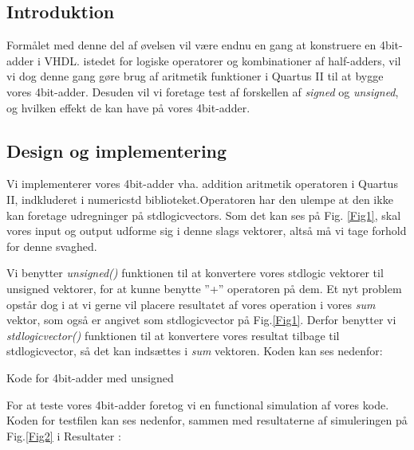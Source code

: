 \documentclass[../journal2.tex]{subfiles}
\begin{document}
\subsection{Introduktion}
Formålet med denne del af øvelsen vil være endnu en gang at konstruere en 4bit-adder i VHDL. istedet for logiske operatorer og kombinationer af half-adders, vil vi dog denne gang gøre brug af aritmetik funktioner i Quartus II til at bygge vores 4bit-adder. Desuden vil vi foretage test af forskellen af \textit{signed} og \textit{unsigned}, og hvilken effekt de kan have på vores 4bit-adder.

\subsection{Design og implementering}
Vi implementerer vores 4bit-adder vha. addition aritmetik operatoren i Quartus II, indkluderet i numeric\textunderscore std biblioteket.Operatoren har den ulempe at den ikke kan foretage udregninger på std\textunderscore logic\textunderscore vectors. Som det kan ses på Fig. \ref{Fig1}, skal vores input og output udforme sig i denne slags vektorer, altså må vi tage forhold for denne svaghed.


Vi benytter \textit{unsigned()} funktionen til at konvertere vores std\textunderscore logic vektorer til unsigned vektorer, for at kunne benytte ''+'' operatoren på dem. Et nyt problem opstår dog i at vi gerne vil placere resultatet af vores operation i vores \textit{sum} vektor, som også er angivet som std\textunderscore logic\textunderscore vector på Fig.\ref{Fig1}. Derfor benytter vi \textit{std\textunderscore logic\textunderscore vector()} funktionen til at konvertere vores resultat tilbage til std\textunderscore logic\textunderscore vector, så det kan indsættes i \textit{sum} vektoren. Koden kan ses nedenfor:

\begin{table}[H]
    \centering
      \framebox{
        \rule{8pt}{0pt}
          
  }
  \caption{Kode for 4bit-adder med unsigned}	
  \label{src:Tab1}
\end{table}

For at teste vores 4bit-adder foretog vi en functional simulation af vores kode. Koden for testfilen kan ses nedenfor, sammen med resultaterne af simuleringen på Fig.\ref{Fig2} i Resultater :
\end{document}
